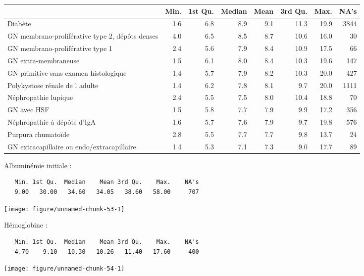\documentclass[11pt,a4paper]{article}\usepackage[]{graphicx}\usepackage[]{color}
\makeatletter
\def\maxwidth{ %
  \ifdim\Gin@nat@width>\linewidth
    \linewidth
  \else
    \Gin@nat@width
  \fi
}
\newenvironment{kframe}{%
 \def\at@end@of@kframe{}%
 \ifinner\ifhmode%
  \def\at@end@of@kframe{\end{minipage}}%
  \begin{minipage}{\columnwidth}%
 \fi\fi%
 \def\FrameCommand##1{\hskip\@totalleftmargin \hskip-\fboxsep
 \colorbox{shadecolor}{##1}\hskip-\fboxsep
     \hskip-\linewidth \hskip-\@totalleftmargin \hskip\columnwidth}%
 \MakeFramed {\advance\hsize-\width
   \@totalleftmargin\z@ \linewidth\hsize
   \@setminipage}}%
 {\par\unskip\endMakeFramed%
 \at@end@of@kframe}
\newenvironment{knitrout}{}{} %
\makeatother
\begin{document}
\begin{table}[H]
\centering
\begingroup\small
\begin{tabular}{lrrrrrrr}
  \hline
 & Min. & 1st Qu. & Median & Mean & 3rd Qu. & Max. & NA's \\ 
  \hline
Diabète & 1.6 & 6.8 & 8.9 & 9.1 & 11.3 & 19.9 & 3844 \\ 
  GN membrano-proliférative type 2, dépôts denses & 4.0 & 6.5 & 8.5 & 8.7 & 10.6 & 16.0 & 30 \\ 
  GN membrano-proliférative type 1 & 2.4 & 5.6 & 7.9 & 8.4 & 10.9 & 17.5 & 66 \\ 
  GN extra-membraneuse & 1.5 & 6.1 & 8.0 & 8.4 & 10.3 & 19.6 & 147 \\ 
  GN primitive sans examen histologique & 1.4 & 5.7 & 7.9 & 8.2 & 10.3 & 20.0 & 427 \\ 
  Polykystose rénale de l adulte & 1.4 & 6.2 & 7.8 & 8.1 & 9.7 & 20.0 & 1111 \\ 
  Néphropathie lupique & 2.4 & 5.5 & 7.5 & 8.0 & 10.4 & 18.8 & 70 \\ 
  GN avec HSF & 1.5 & 5.8 & 7.7 & 7.9 & 9.9 & 17.2 & 356 \\ 
  Néphropathie à dépôts d'IgA & 1.6 & 5.7 & 7.6 & 7.9 & 9.7 & 19.8 & 576 \\ 
  Purpura rhumatoïde & 2.8 & 5.5 & 7.7 & 7.7 & 9.8 & 13.7 & 24 \\ 
  GN extracapillaire ou endo/extracapillaire & 1.4 & 5.3 & 7.1 & 7.3 & 9.0 & 17.7 & 89 \\ 
   \hline
\end{tabular}
\endgroup
\end{table}


Albuminémie initiale :

\begin{knitrout}
\color{fgcolor}\begin{kframe}
\begin{verbatim}
   Min. 1st Qu.  Median    Mean 3rd Qu.    Max.    NA's 
   9.00   30.00   34.60   34.05   38.60   58.00     707 
\end{verbatim}
\end{kframe}
\texttt{[image: figure/unnamed-chunk-53-1]} 

\end{knitrout}

Hémoglobine :

\begin{knitrout}
\color{fgcolor}\begin{kframe}
\begin{verbatim}
   Min. 1st Qu.  Median    Mean 3rd Qu.    Max.    NA's 
   4.70    9.10   10.30   10.26   11.40   17.60     400 
\end{verbatim}
\end{kframe}
\texttt{[image: figure/unnamed-chunk-54-1]} 

\end{knitrout}
\end{document}
